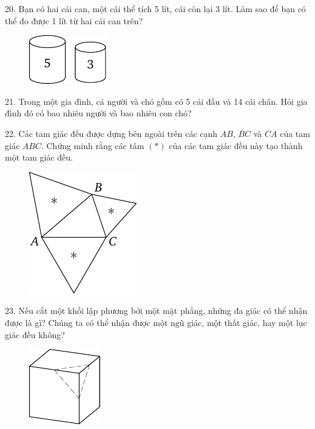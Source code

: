 \begin{problem}{20.}
	Bạn có hai cái can, một cái thể tích 5 lít, cái còn lại 3 lít. Làm sao để bạn có thể đo được 1 lít từ hai cái can trên?
	\begin{figure}
		\includegraphics{taskbook-4}
	\end{figure}
\end{problem}

\begin{problem}{21.}
	Trong một gia đình, cả người và chó gồm có 5 cái đầu và 14 cái chân. Hỏi gia đình đó có bao nhiêu người và bao nhiêu con chó?
\end{problem}

\begin{problem}{22.}
	Các tam giác đều được dựng bên ngoài trên các cạnh  $AB$, $BC$ và $CA$ của tam giác $ABC$. Chứng minh rằng các tâm $(*)$ của các tam giác đều này tạo thành một tam giác đều.
	\begin{figure}
		\includegraphics{taskbook-6}
	\end{figure}
\end{problem}

\begin{problem}{23.}
	Nếu cắt một khối lập phương bởi một mặt phẳng, những đa giác có thể nhận được là gì? Chúng ta có thể nhận được một ngũ giác,  một thất giác, hay   một lục giác đều không?
	\begin{figure}
		\includegraphics{taskbook-7}
	\end{figure}
\end{problem}

